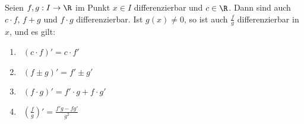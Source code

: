 Seien $f, g: I \to \R$ im Punkt $x \in I$ differenzierbar und $c \in \R$. Dann sind auch $c \cdot f$, $f+g$ und $f \cdot g$ differenzierbar. Ist $g(x) \neq 0$, so ist auch $\frac{f}{g}$ differenzierbar in $x$, und es gilt:
\begin{enumerate}[leftmargin=0pt,label=""]
    \item {} \, $(c \cdot f)' = c \cdot f'$
    \item {} \, $(f \pm g)' = f' \pm g'$
    \item {} \, $(f \cdot g)' = f' \cdot g + f \cdot g'$
    \item {} \, $\left(\frac{f}{g}\right)' = \frac{f' g - f g'}{g^2}$
\end{enumerate}